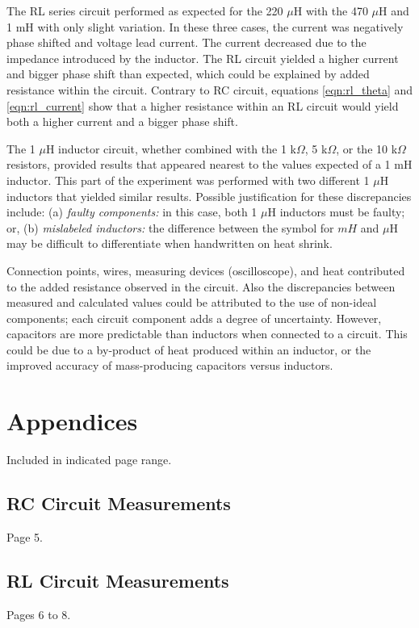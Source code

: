 \documentclass[12pt]{article}
\begin{document}
The RL series circuit performed as expected for the 220 $\mu$H with the 470 $\mu$H and 1 mH with only slight variation. In these three cases, the current was negatively phase shifted and voltage lead current. The current decreased due to the impedance introduced by the inductor. The RL circuit yielded a higher current and bigger phase shift than expected, which could be explained by added resistance within the circuit. Contrary to RC circuit, equations \eqref{eqn:rl_theta} and \eqref{eqn:rl_current} show that a higher resistance within an RL circuit would yield both a higher current and a bigger phase shift. 

The 1 $\mu$H inductor circuit, whether combined with the 1 k$\Omega$, 5 k$\Omega$, or the 10 k$\Omega$ resistors, provided results that appeared nearest to the values expected of a 1 mH inductor. This part of the experiment was performed with two different 1 $\mu$H inductors that yielded similar results. Possible justification for these discrepancies include: (a)\textit{ faulty components:} in this case, both 1 $\mu$H inductors must be faulty; or, (b)\textit{ mislabeled inductors:} the difference between the symbol for $mH$ and $\mu$H may be difficult to differentiate when handwritten on heat shrink.

Connection points, wires, measuring devices (oscilloscope), and heat contributed to the added resistance observed in the circuit. Also the discrepancies between measured and calculated values could be attributed to the use of non-ideal components; each circuit component adds a degree of uncertainty. However, capacitors are more predictable than inductors when connected to a circuit. This could be due to a by-product of heat produced within an inductor, or the improved accuracy of mass-producing capacitors versus inductors.

\section{Appendices}\label{sec:appendices}
Included in indicated page range.
\subsection{RC Circuit Measurements}\label{sec:rc_meas}
Page 5.
\subsection{RL Circuit Measurements}\label{sec:rl_meas}
Pages 6 to 8.
\end{document}
